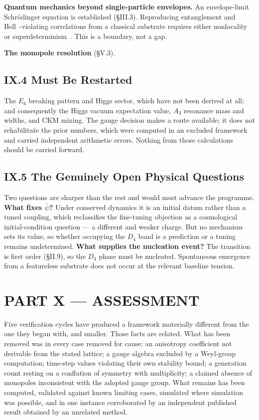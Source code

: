 \documentclass[11pt,a4paper]{article}
\begin{document}
\textbf{Quantum mechanics beyond single-particle envelopes.} An envelope-limit Schr\"odinger equation is established (\S III.3). Reproducing entanglement and Bell~\cite{bell1964}-violating correlations from a classical substrate requires either nonlocality or superdeterminism~\cite{hossenfelder2020}. This is a boundary, not a gap.

\textbf{The monopole resolution} (\S V.3).

\subsection{IX.4 Must Be Restarted}
The $E_6$ breaking pattern and Higgs sector, which have not been derived at all; and consequently the Higgs vacuum expectation value, $A_3$ resonance mass and widths, and CKM mixing. The gauge decision makes a route available; it does not rehabilitate the prior numbers, which were computed in an excluded framework and carried independent arithmetic errors. Nothing from those calculations should be carried forward.

\subsection{IX.5 The Genuinely Open Physical Questions}
Two questions are sharper than the rest and would most advance the programme. \textbf{What fixes $\bar{\psi}$?} Under conserved dynamics it is an initial datum rather than a tuned coupling, which reclassifies the fine-tuning objection as a cosmological initial-condition question --- a different and weaker charge. But no mechanism sets its value, so whether occupying the $D_4$ band is a prediction or a tuning remains undetermined. \textbf{What supplies the nucleation event?} The transition is first order (\S II.9), so the $D_4$ phase must be nucleated. Spontaneous emergence from a featureless substrate does not occur at the relevant baseline tension.

\section{PART X --- ASSESSMENT}
Five verification cycles have produced a framework materially different from the one they began with, and smaller. Those facts are related. What has been removed was in every case removed for cause: an anisotropy coefficient not derivable from the stated lattice; a gauge algebra excluded by a Weyl-group computation; time-step values violating their own stability bound; a generation count resting on a conflation of symmetry with multiplicity; a claimed absence of monopoles inconsistent with the adopted gauge group. What remains has been computed, validated against known limiting cases, simulated where simulation was possible, and in one instance corroborated by an independent published result obtained by an unrelated method.
\end{document}

